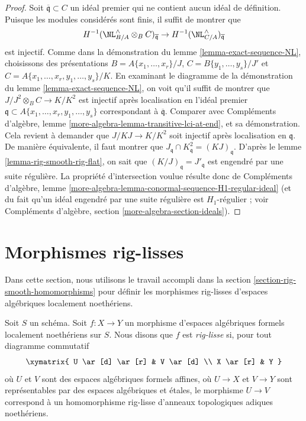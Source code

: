 \begin{proof}
Soit $\overline{\mathfrak q} \subset C$ un idéal premier qui ne contient
aucun idéal de définition. Puisque les modules considérés sont finis,
il suffit de montrer que
$$
H^{-1}(\NL_{B/A}^\wedge \otimes_B C)_{\overline{\mathfrak q}} \to
H^{-1}(\NL_{C/A}^\wedge)_{\overline{\mathfrak q}}
$$
est injectif. Comme dans la démonstration du lemme \ref{lemma-exact-sequence-NL},
choisissons des présentations $B = A\{x_1, \ldots, x_r\}/J$,
$C = B\{y_1, \ldots, y_s\}/J'$ et
$C = A\{x_1, \ldots, x_r, y_1, \ldots, y_s\}/K$.
En examinant le diagramme de la démonstration du lemme \ref{lemma-exact-sequence-NL},
on voit qu'il suffit de montrer que $J/J^2 \otimes_B C \to K/K^2$
est injectif après localisation en l'idéal premier
$\mathfrak q \subset A\{x_1, \ldots, x_r, y_1, \ldots, y_s\}$
correspondant à $\overline{\mathfrak q}$. Comparer avec
Compléments d'algèbre, lemme \ref{more-algebra-lemma-transitive-lci-at-end},
et sa démonstration. Cela revient à demander que $J/KJ \to K/K^2$
soit injectif après localisation en $\mathfrak q$. De manière équivalente,
il faut montrer que $J_\mathfrak q \cap K^2_\mathfrak q = (KJ)_\mathfrak q$.
D'après le lemme \ref{lemma-rig-smooth-rig-flat},
on sait que $(K/J)_\mathfrak q = J'_\mathfrak q$
est engendré par une suite régulière.
La propriété d'intersection voulue résulte donc de
Compléments d'algèbre, lemme
\ref{more-algebra-lemma-conormal-sequence-H1-regular-ideal}
(et du fait qu'un idéal engendré par une suite régulière
est $H_1$-régulier ; voir
Compléments d'algèbre, section \ref{more-algebra-section-ideals}).
\end{proof}









\section{Morphismes rig-lisses}
\label{section-rig-smooth-morphisms}

\noindent
Dans cette section, nous utilisons le travail accompli dans la
section \ref{section-rig-smooth-homomorphisms}
pour définir les morphismes rig-lisses d'espaces algébriques localement noethériens.

\begin{definition}
\label{definition-rig-smooth}
Soit $S$ un schéma. Soit $f : X \to Y$ un morphisme d'espaces algébriques
formels localement noethériens sur $S$. Nous disons que $f$ est
{\it rig-lisse} si, pour tout diagramme commutatif
$$
\xymatrix{
U \ar[d] \ar[r] & V \ar[d] \\
X \ar[r] & Y
}
$$
où $U$ et $V$ sont des espaces algébriques formels affines, où $U \to X$ et $V \to Y$
sont représentables par des espaces algébriques et étales, le morphisme $U \to V$
correspond à un homomorphisme rig-lisse d'anneaux topologiques adiques noethériens.
\end{definition}

